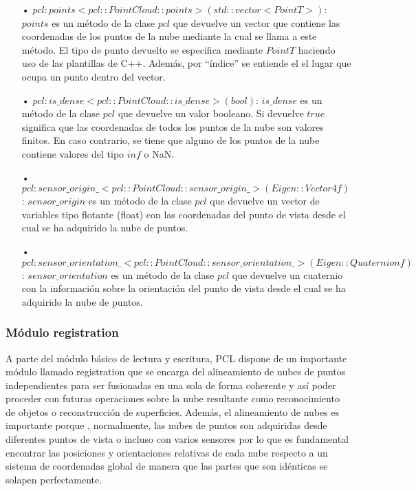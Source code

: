 \begin{itemize}
\item[•]$pcl:points<pcl::PointCloud::points> (std::vector<PointT>)$: $points$ es un método de la clase $pcl$ que devuelve un vector que contiene las coordenadas de los puntos de la nube mediante la cual se llama a este método. El tipo de punto devuelto se especifica mediante $PointT$ haciendo uso de las plantillas de C++. Además, por ``índice'' se entiende el el lugar que ocupa un punto dentro del vector.
\item[•]$pcl:is\_dense<pcl::PointCloud::is\_dense> (bool)$: $is\_dense$ es un método de la clase $pcl$ que devuelve un valor booleano. Si devuelve $true$ significa que las coordenadas de todos los puntos de la nube son valores finitos. En caso contrario, se tiene que alguno de los puntos de la nube contiene valores del tipo $inf$ o NaN.
\item[•]$pcl:sensor\_origin\_<pcl::PointCloud::sensor\_origin\_> (Eigen::Vector4f)$: $sensor\_origin$ es un método de la clase $pcl$ que devuelve un vector de variables tipo flotante (float) con las coordenadas del punto de vista desde el cual se ha adquirido la nube de puntos.

\item[•]$pcl:sensor\_orientation\_<pcl::PointCloud::sensor\_orientation\_> (Eigen::Quaternionf)$: $sensor\_orientation$ es un método de la clase $pcl$ que devuelve un cuaternio con la información sobre la orientación del punto de vista desde el cual se ha adquirido la nube de puntos.
\end{itemize}

\subsubsection{Módulo registration}
A parte del módulo básico de lectura y escritura, PCL dispone de un importante módulo llamado registration\cite{registration} que se encarga del alineamiento de nubes de puntos independientes para ser fusionadas en una sola de forma coherente y así poder proceder con futuras operaciones sobre la nube resultante como reconocimiento de objetos o reconstrucción de superficies. Además, el alineamiento de nubes es importante porque , normalmente, las nubes de puntos son adquiridas desde diferentes puntos de vista o incluso con varios sensores por lo que es fundamental encontrar las posiciones y orientaciones relativas de cada nube respecto a un sistema de coordenadas global de manera que las partes que son idénticas se solapen perfectamente. 

